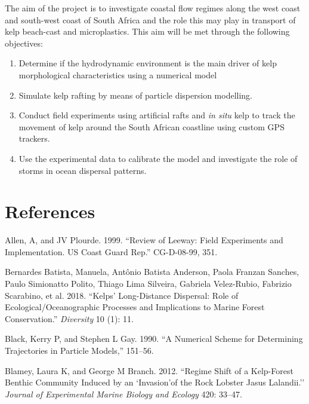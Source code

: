 \documentclass[
]{article}
\begin{document}
The aim of the project is to investigate coastal flow regimes along the
west coast and south-west coast of South Africa and the role this may
play in transport of kelp beach-cast and microplastics. This aim will be
met through the following objectives:

\begin{enumerate}
\def\labelenumi{\arabic{enumi}.}
\item
  Determine if the hydrodynamic environment is the main driver of kelp
  morphological characteristics using a numerical model
\item
  Simulate kelp rafting by means of particle dispersion modelling.
\item
  Conduct field experiments using artificial rafts and \emph{in situ}
  kelp to track the movement of kelp around the South African coastline
  using custom GPS trackers.
\item
  Use the experimental data to calibrate the model and investigate the
  role of storms in ocean dispersal patterns.
\end{enumerate}

\hypertarget{references}{%
\section*{References}\label{references}}

\hypertarget{refs}{}
\leavevmode\hypertarget{ref-allen1999review}{}%
Allen, A, and JV Plourde. 1999. ``Review of Leeway: Field Experiments
and Implementation. US Coast Guard Rep.'' CG-D-08-99, 351.

\leavevmode\hypertarget{ref-bernardes2018}{}%
Bernardes Batista, Manuela, Antônio Batista Anderson, Paola Franzan
Sanches, Paulo Simionatto Polito, Thiago Lima Silveira, Gabriela
Velez-Rubio, Fabrizio Scarabino, et al. 2018. ``Kelps' Long-Distance
Dispersal: Role of Ecological/Oceanographic Processes and Implications
to Marine Forest Conservation.'' \emph{Diversity} 10 (1): 11.

\leavevmode\hypertarget{ref-black1990}{}%
Black, Kerry P, and Stephen L Gay. 1990. ``A Numerical Scheme for
Determining Trajectories in Particle Models,'' 151--56.

\leavevmode\hypertarget{ref-Blamey2012}{}%
Blamey, Laura K, and George M Branch. 2012. ``Regime Shift of a
Kelp-Forest Benthic Community Induced by an `Invasion'of the Rock
Lobster Jasus Lalandii.'' \emph{Journal of Experimental Marine Biology
and Ecology} 420: 33--47.
\end{document}
